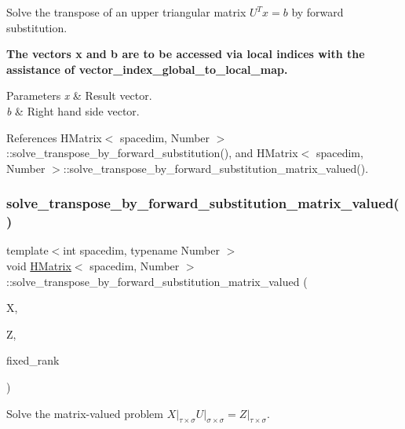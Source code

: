 Solve the transpose of an upper triangular matrix $U^Tx=b$ by forward substitution.

{\bfseries The vectors {\ttfamily x} and {\ttfamily b} are to be accessed via local indices with the assistance of {\ttfamily vector\+\_\+index\+\_\+global\+\_\+to\+\_\+local\+\_\+map}.}


\begin{DoxyParams}{Parameters}
{\em x} & Result vector. \\
\hline
{\em b} & Right hand side vector. \\
\hline
\end{DoxyParams}


References H\+Matrix$<$ spacedim, Number $>$\+::solve\+\_\+transpose\+\_\+by\+\_\+forward\+\_\+substitution(), and H\+Matrix$<$ spacedim, Number $>$\+::solve\+\_\+transpose\+\_\+by\+\_\+forward\+\_\+substitution\+\_\+matrix\+\_\+valued().

\mbox{\label{classHMatrix_a469507ef4061efcc29a65c413ac7acea}} 
\subsubsection{\texorpdfstring{solve\+\_\+transpose\+\_\+by\+\_\+forward\+\_\+substitution\+\_\+matrix\+\_\+valued()}{solve\_transpose\_by\_forward\_substitution\_matrix\_valued()}}
{\footnotesize\ttfamily template$<$int spacedim, typename Number $>$ \\
void \hyperlink{classHMatrix}{H\+Matrix}$<$ spacedim, Number $>$\+::solve\+\_\+transpose\+\_\+by\+\_\+forward\+\_\+substitution\+\_\+matrix\+\_\+valued (\begin{DoxyParamCaption}\item[{\hyperlink{classHMatrix}{H\+Matrix}$<$ spacedim, Number $>$ \&}]{X,  }\item[{\hyperlink{classHMatrix}{H\+Matrix}$<$ spacedim, Number $>$ \&}]{Z,  }\item[{const unsigned int}]{fixed\+\_\+rank }\end{DoxyParamCaption})}

Solve the matrix-\/valued problem $X\vert_{\tau\times\sigma}U\vert_{\sigma\times\sigma} = Z\vert_{\tau\times\sigma}$.

